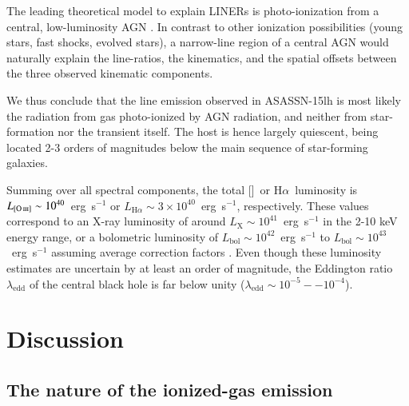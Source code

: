 \documentclass[traditabstract]{aa}
\newcommand{\ha}{H$\alpha$}
\newcommand{\oiii}{[\ion{O}{iii}]}
\begin{document}
The leading theoretical model to explain LINERs is photo-ionization from a central, low-luminosity AGN \citep[e.g.,][for a review]{2008ARA&A..46..475H}. In contrast to other ionization possibilities (young stars, fast shocks, evolved stars), a narrow-line region of a central AGN would naturally explain the line-ratios, the kinematics, and the spatial offsets between the three observed kinematic components.

We thus conclude that the line emission observed in ASASSN-15lh is most likely the radiation from gas photo-ionized by AGN radiation, and neither from star-formation nor the transient itself. The host is hence largely quiescent, being located 2-3 orders of magnitudes below the main sequence of star-forming galaxies.

Summing over all spectral components, the total \oiii~or \ha~luminosity is $L_{\oiii}\sim10^{40}$~erg~s$^{-1}$ or $L_{\mathrm{H}\alpha} \sim 3 \times 10^{40}$~erg~s$^{-1}$, respectively. These values correspond to an X-ray luminosity of around $L_{\mathrm{X}}\sim10^{41}$~erg~s$^{-1}$ in the 2-10 keV energy range, or a bolometric luminosity of $L_{\mathrm{bol}}\sim10^{42}$~erg~s$^{-1}$ to $L_{\mathrm{bol}}\sim10^{43}$~erg~s$^{-1}$ assuming average correction factors \citep{2008ARA&A..46..475H, 2009A&A...504...73L, 2012MNRAS.425..623L}. Even though these luminosity estimates are uncertain by at least an order of magnitude, the Eddington ratio $\lambda_{\mathrm{edd}}$ of the central black hole is far below unity ($\lambda_{\mathrm{edd}}\sim10^{-5}--10^{-4}$).

\section{Discussion}
\label{sec:Disc}

\subsection{The nature of the ionized-gas emission}
\end{document}
